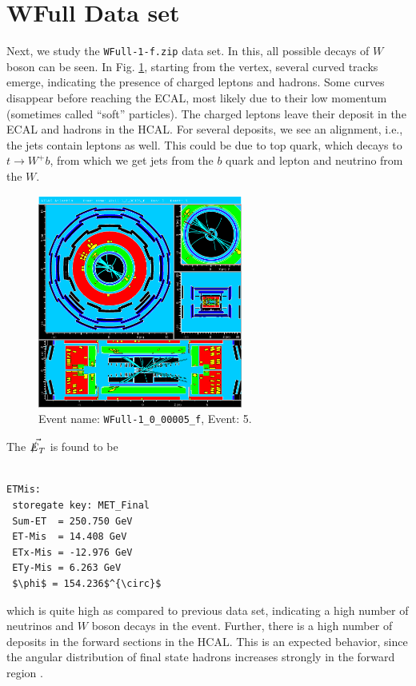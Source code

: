 \documentclass[a4paper]{report}
\numberwithin{equation}{section}
\begin{document}
\section{WFull Data set}

Next, we study the \texttt{WFull-1-f.zip} data set. In this, all possible decays of $W$ boson can be seen. In Fig. \ref{fig:wfull}, starting from the vertex, several curved tracks emerge, indicating the presence of charged leptons and hadrons. Some curves disappear before reaching the ECAL, most likely due to their low momentum (sometimes called ``soft'' particles). The charged leptons leave their deposit in the ECAL and hadrons in the HCAL. For several deposits, we see an alignment, i.e., the jets contain leptons as well. This could be due to top quark, which decays to $t \rightarrow W^+ b$, from which we get jets from the $b$ quark and lepton and neutrino from the $W$. 

\begin{figure}[htpb]
    \centering
    \includegraphics[width=0.6\textwidth]{WFull-1_0_00005_f-YX-RZ-RZ-YX-2022-05-23-13-21-03}
    \caption{Event name: \texttt{WFull-1\_0\_00005\_f}, Event: 5.}
    \label{fig:wfull}
\end{figure}

The $\vec{\slashed{E}_T}$ is found to be 

\begin{lstlisting}

ETMis:
 storegate key: MET_Final
 Sum-ET  = 250.750 GeV
 ET-Mis  = 14.408 GeV
 ETx-Mis = -12.976 GeV
 ETy-Mis = 6.263 GeV
 $\phi$ = 154.236$^{\circ}$
\end{lstlisting}
which is quite high as compared to previous data set, indicating a high number of neutrinos and $W$ boson decays in the event. Further, there is a high number of deposits in the forward sections in the HCAL. This is an expected behavior, since the angular distribution of final state hadrons increases strongly in the forward region \cite{labman}. 
\end{document}
